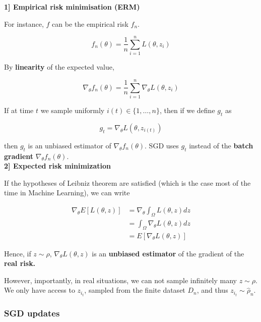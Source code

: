 \documentclass[
10pt, %
a4paper, %
oneside, %
headinclude,footinclude, %
BCOR5mm, %
]{scrartcl}
\begin{document}
\textbf{{1] Empirical risk minimisation (ERM)}}

For instance, $f$ can be the empirical risk $f_n$.

\begin{equation*}
    f_n(\theta) =  \frac{1}{n} \sum^{n}_{i=1} L(\theta, z_i)
\end{equation*}

By \textbf{{linearity}} of the expected value,

\begin{equation}
    \label{eq:sgdest}
    \nabla_{\theta} f_n(\theta) = \frac{1}{n} \sum^{n}_{i=1} \nabla_{\theta}L(\theta, z_i)
\end{equation}

If at time $t$ we sample uniformly $i(t)\in \{1, \dots, n\}$, then if we define $g_t$ as

\begin{equation*}
    g_t = \nabla_{\theta}L(\theta, z_{i(t)})
\end{equation*}

then $g_t$ is an unbiased estimator of $\nabla_{\theta}f_n(\theta)$. SGD uses $g_t$ instead of the \textbf{{batch gradient}} $\nabla_{\theta}f_n(\theta)$.
\\

\textbf{{2] Expected risk minimization}} 

If the hypotheses of Leibniz theorem are satisfied (which is the case most of the time in Machine Learning), we can write

\begin{equation*}
    \begin{aligned}
	\nabla_{\theta}E[L(\theta, z)]&= \nabla_{\theta} \int_{\Omega} L(\theta, z) dz\\
	&= \int_{\Omega} \nabla_{\theta}L(\theta, z) dz\\
	&= E[\nabla_{\theta}L(\theta, z)]
    \end{aligned}
\end{equation*}

Hence, if $z\sim \rho$, $\nabla_{\theta}L(\theta, z)$ is an \textbf{{unbiased estimator}} of the gradient of the \textbf{{real risk.}} 

However, importantly, in real situations, we can not sample infinitely many $z\sim \rho$. We only have access to $z_{i_t}$, sampled from the finite dataset $D_n$, and thus $z_{i_t}\sim \hat{\rho}_n$.

\subsubsection{\large\color{Periwinkle}SGD updates}
\end{document}
